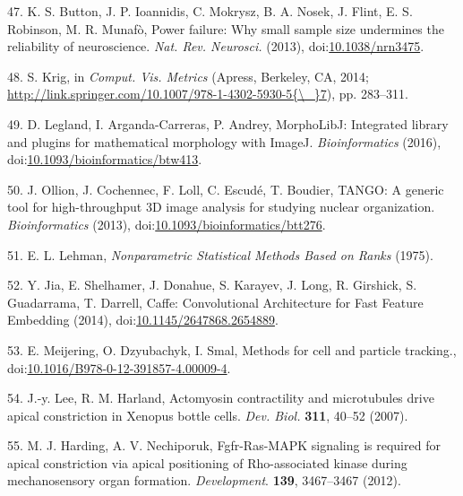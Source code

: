 \documentclass[11pt,singlespacinge,twoside]{reedthesis} %
\begin{document}
\leavevmode\hypertarget{ref-Button2013}{}%
47. K. S. Button, J. P. Ioannidis, C. Mokrysz, B. A. Nosek, J. Flint, E. S. Robinson, M. R. Munafò, Power failure: Why small sample size undermines the reliability of neuroscience. \emph{Nat. Rev. Neurosci.} (2013), doi:\href{https://doi.org/10.1038/nrn3475}{10.1038/nrn3475}.

\leavevmode\hypertarget{ref-Krig2014}{}%
48. S. Krig, in \emph{Comput. Vis. Metrics} (Apress, Berkeley, CA, 2014; \href{http://link.springer.com/10.1007/978-1-4302-5930-5\%7B/_\%7D7}{http://link.springer.com/10.1007/978-1-4302-5930-5\{\textbackslash{}\_\}7}), pp. 283--311.

\leavevmode\hypertarget{ref-Legland2016}{}%
49. D. Legland, I. Arganda-Carreras, P. Andrey, MorphoLibJ: Integrated library and plugins for mathematical morphology with ImageJ. \emph{Bioinformatics} (2016), doi:\href{https://doi.org/10.1093/bioinformatics/btw413}{10.1093/bioinformatics/btw413}.

\leavevmode\hypertarget{ref-Ollion2013}{}%
50. J. Ollion, J. Cochennec, F. Loll, C. Escudé, T. Boudier, TANGO: A generic tool for high-throughput 3D image analysis for studying nuclear organization. \emph{Bioinformatics} (2013), doi:\href{https://doi.org/10.1093/bioinformatics/btt276}{10.1093/bioinformatics/btt276}.

\leavevmode\hypertarget{ref-Lehman}{}%
51. E. L. Lehman, \emph{Nonparametric Statistical Methods Based on Ranks} (1975).

\leavevmode\hypertarget{ref-Jia2014}{}%
52. Y. Jia, E. Shelhamer, J. Donahue, S. Karayev, J. Long, R. Girshick, S. Guadarrama, T. Darrell, Caffe: Convolutional Architecture for Fast Feature Embedding (2014), doi:\href{https://doi.org/10.1145/2647868.2654889}{10.1145/2647868.2654889}.

\leavevmode\hypertarget{ref-Meijering2012}{}%
53. E. Meijering, O. Dzyubachyk, I. Smal, Methods for cell and particle tracking., doi:\href{https://doi.org/10.1016/B978-0-12-391857-4.00009-4}{10.1016/B978-0-12-391857-4.00009-4}.

\leavevmode\hypertarget{ref-Lee2009}{}%
54. J.-y. Lee, R. M. Harland, Actomyosin contractility and microtubules drive apical constriction in Xenopus bottle cells. \emph{Dev. Biol.} \textbf{311}, 40--52 (2007).

\leavevmode\hypertarget{ref-Harding2012}{}%
55. M. J. Harding, A. V. Nechiporuk, Fgfr-Ras-MAPK signaling is required for apical constriction via apical positioning of Rho-associated kinase during mechanosensory organ formation. \emph{Development}. \textbf{139}, 3467--3467 (2012).
\end{document}
